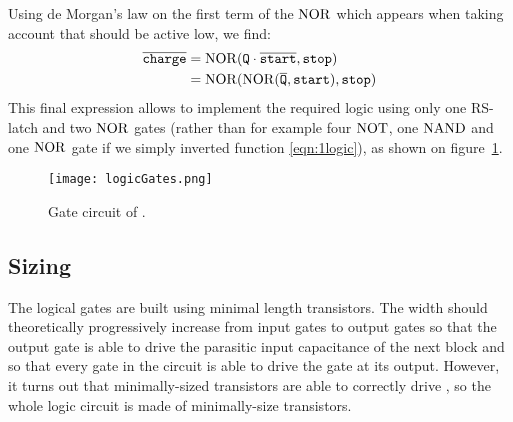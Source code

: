 Using de Morgan's law on the first term of the $\operatorname{NOR}$ which appears when taking account that  should be active low, we find:
\begin{align*}
\overline{\mathtt{charge}} &= \operatorname{NOR}(\mathtt{Q}\cdot\overline{\mathtt{start}}, \mathtt{stop})\\
&=\operatorname{NOR}(\operatorname{NOR}(\overline{\mathtt{Q}}, \mathtt{start}), \mathtt{stop})
\end{align*}
This final expression allows to implement the required logic using only one RS-latch and two $\operatorname{NOR}$ gates (rather than for example four $\operatorname{NOT}$, one $\operatorname{NAND}$ and one $\operatorname{NOR}$ gate if we simply inverted function \ref{eqn:1logic}), as shown on figure~\ref{fig:blklogic}.
\begin{figure}
  \centering
  \texttt{[image: logicGates.png]}
  \caption{Gate circuit of .\label{fig:blklogic}}
\end{figure}

\subsection{Sizing}
The logical gates are built using minimal length transistors. The width should theoretically progressively increase from input gates to output gates so that the output gate is able to drive the parasitic input capacitance of the next block and so that every gate in the circuit is able to drive the gate at its output. However, it turns out that minimally-sized transistors are able to correctly drive , so the whole logic circuit is made of minimally-size transistors.
